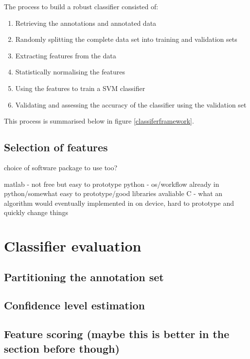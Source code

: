 The process to build a robust classifier consisted of:

\begin{enumerate}
\item Retrieving the annotations and annotated data

\item Randomly splitting the complete data set into training and validation sets

\item Extracting features from the data

\item Statistically normalising the features

\item Using the features to train a SVM classifier

\item Validating and assessing the accuracy of the classifier using the validation set
\end{enumerate}

This process is summarised below in figure \ref{classiferframework}.

\subsection{Selection of features}




choice of software package to use too?

matlab - not free but easy to prototype
python - os/workflow already in python/somewhat easy to prototype/good libraries avaliable
C - what an algorithm would eventually implemented in on device, hard to prototype and quickly change things




\section{Classifier evaluation}


\subsection{Partitioning the annotation set}


\subsection{Confidence level estimation}

\subsection{Feature scoring (maybe this is better in the section before though)}


